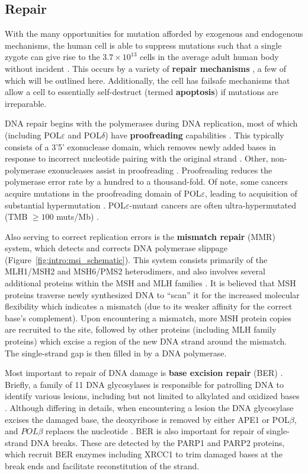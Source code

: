 \subsection{Repair}
With the many opportunities for mutation afforded by exogenous and endogenous mechanisms, the human cell is able to suppress mutations such that a single zygote can give rise to the \textapprox{}$3.7 \times 10^{13}$ cells in the average adult human body without incident \cite{bianconi2013}. This occurs by a variety of \textbf{repair mechanisms} \cite{chatterjee2017}, a few of which will be outlined here. Additionally, the cell has failsafe mechanisms that allow a cell to essentially self-destruct (termed \textbf{apoptosis}) if mutations are irreparable.

DNA repair begins with the polymerases during DNA replication, most of which (including POL$\varepsilon$ and POL$\delta$) have \textbf{proofreading} capabilities \cite{albertson2006}. This typically consists of a 3'\textrightarrow{}5' exonuclease domain, which removes newly added bases in response to incorrect nucleotide pairing with the original strand \cite{bebenek2018}. Other, non-polymerase exonucleases assist in proofreading \cite{mason2012}. Proofreading reduces the polymerase error rate by a hundred to a thousand-fold. Of note, some cancers acquire mutations in the proofreading domain of POL$\varepsilon$, leading to acquisition of substantial hypermutation \cite{schlesner2015}. POL$\varepsilon$-mutant cancers are often ultra-hypermutated (TMB $\ge 100$ muts/Mb) \cite{campbell2017}.

Also serving to correct replication errors is the \textbf{mismatch repair} (MMR) system, which detects and corrects DNA polymerase slippage \cite{baretti2018} (Figure~\ref{fig:intro:msi_schematic}). This system consists primarily of the MLH1/MSH2 and MSH6/PMS2 heterodimers, and also involves several additional proteins within the MSH and MLH families \cite{fishel2015}. It is believed that MSH proteins traverse newly synthesized DNA to ``scan'' it for the increased molecular flexibility which indicates a mismatch (due to its weaker affinity for the correct base's complement). Upon encountering a mismatch, more MSH protein copies are recruited to the site, followed by other proteins (including MLH family proteins) which excise a region of the new DNA strand around the mismatch. The single-strand gap is then filled in by a DNA polymerase.

Most important to repair of DNA damage is \textbf{base excision repair} (BER) \cite{zharkov2008}. Briefly, a family of 11 DNA glycosylases is responsible for patrolling DNA to identify various lesions, including but not limited to alkylated and oxidized bases \cite{krokan2013}. Although differing in details, when encountering a lesion the DNA glycosylase excises the damaged base, the deoxyribose is removed by either APE1 or POL$\beta$, and $POL\beta$ replaces the nucleotide \cite{wallace2014}. BER is also important for repair of single-strand DNA breaks. These are detected by the PARP1 and PARP2 proteins, which recruit BER enzymes including XRCC1 to trim damaged bases at the break ends and facilitate reconstitution of the strand.

